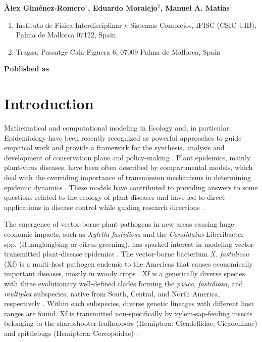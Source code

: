\vspace{1cm}

\textbf{Àlex Giménez-Romero$^{1}$, Eduardo Moralejo$^{2}$, Manuel A.
    Matías$^{1}$}

\vspace{1cm}

\begin{enumerate}
    \small
    \item Instituto de Física Interdisciplinar y Sistemas Complejos, IFISC
          (CSIC-UIB), Palma de Mallorca 07122, Spain
    \item Tragsa, Passatge Cala Figuera 6, 07009 Palma de Mallorca, Spain
\end{enumerate}

\vspace{1cm}

\textbf{Published as}

\vspace{0.5cm}


\newpage
\section{Introduction}

Mathematical and computational modeling in Ecology and, in particular,
Epidemiology have been recently recognized as powerful approaches to guide
empirical work and provide a framework for the synthesis, analysis and
development of conservation plans and policy-making
\cite{levin1992mathematics,Murray_book,sarkar2006biodiversity,Chew2014}.
Plant epidemics, mainly plant-virus diseases, have been often described by
compartmental models, which deal with the overriding importance of transmission
mechanisms in determining epidemic dynamics
\cite{Jeger1998,Jeger2004,Madden2000}. These models have contributed to
providing answers to some questions related to the ecology of plant diseases
and have led to direct applications in disease control while guiding research
directions \cite{Jeger2019}.

The emergence of vector-borne plant pathogens in new areas causing huge
economic impacts, such as \textit{Xylella fastidiosa} and the
\textit{Candidatus} Liberibacter spp. (Huanglongbing or citrus greening), has
sparked interest in modeling vector-transmitted plant-disease epidemics
\cite{chiyaka2012modeling,Jeger2019}. The vector-borne bacterium \textit{X.
    fastidiosa} (Xf) is a multi-host pathogen endemic to the Americas that
causes
economically important diseases, mostly in woody crops \cite{Hopkins2002}. Xf
is a genetically diverse species with three evolutionary well-defined clades
forming the \textit{pauca}, \textit{fastidiosa}, and \textit{multiplex}
subspecies, native from South, Central, and North America, respectively
\cite{vanhove2019genomic}. Within each subspecies, diverse genetic lineages
with different host ranges are found. Xf is transmitted non-specifically by
xylem-sap-feeding insects belonging to the sharpshooter leafhoppers (Hemiptera:
Cicadellidae, Cicadellinae) and spittlebugs (Hemiptera: Cercopoidae)
\cite{Redak2004}.

